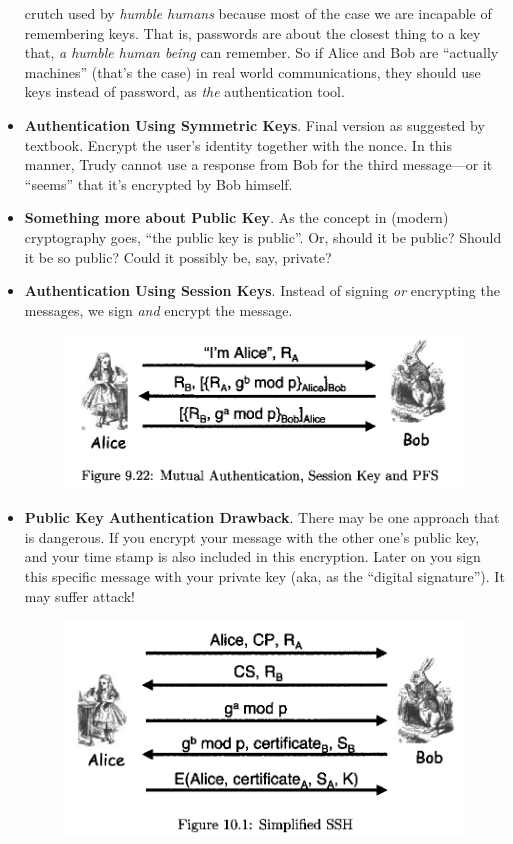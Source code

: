 \documentclass[twocolumn]{article}
\begin{document}
\begin{itemize}
  crutch used by \emph{humble humans} because most of the case we are
  incapable of remembering keys. That is, passwords are about the
  closest thing to a key that, \emph{a humble human being} can
  remember. So if Alice and Bob are ``actually machines'' (that's the
  case) in real world communications, they should use keys instead of
  password, as \emph{the} authentication tool.
\item \textbf{Authentication Using Symmetric Keys}. Final version as
  suggested by textbook. Encrypt the user's identity together with the
  nonce. In this manner, Trudy cannot use a response from Bob for the
  third message---or it ``seems'' that it's encrypted by Bob himself.
\item \textbf{Something more about Public Key}. As the concept in
  (modern) cryptography goes, ``the public key is public''. Or, should
  it be public? Should it be so public? Could it possibly be, say,
  private? 
\item \textbf{Authentication Using Session Keys}. Instead of signing
  \emph{or} encrypting the messages, we sign \emph{and} encrypt the
  message.
  \begin{figure}[htbp]
    \centering
    \label{fig:mutual-authentication-session-key}
    \includegraphics[scale=0.28]{Mutual-Authentication}   
  \end{figure}
\item \textbf{Public Key Authentication Drawback}. There may be one
  approach that is dangerous. If you encrypt your message with the
  other one's public key, and your time stamp is also included in this
  encryption. Later on you sign this specific message with your
  private key (aka, as the ``digital signature''). It may suffer
  attack! 
  \begin{figure}[htbp]
    \centering
    \label{fig:simplified-ssh}
    \includegraphics[scale=0.3]{Simplified-SSH}

\end{figure}
\end{itemize}
\end{document}
